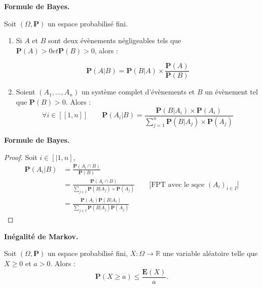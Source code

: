 \documentclass{beamer}
\begin{document}
\begin{frame}{\textbf{Formule de Bayes.}}
    \begin{theorem}
        Soit $(\Omega, \mathbf{P})$ un espace probabilisé fini.
        \begin{enumerate}[label=(\alph*)]
            \item Si $A$ et $B$ sont deux évènements négligeables tels que $\mathbf{P}(A) > 0 et \mathbf{P}(B) > 0$, alors : 
            
            \[
                \mathbf{P}(A|B) = \mathbf{P}(B|A) \times \frac{\mathbf{P}(A)}{\mathbf{P}(B)}    
            \]
            \item Soient $(A_1, \ldots, A_n)$ un système complet d'évènements et $B$ un évènement tel que $\mathbf{P}(B) > 0$. Alors :
            \[
                \forall i \in [[1, n]] \qquad \mathbf{P}(A_i | B) = \frac{\mathbf{P}(B|A_i)\times \mathbf{P}(A_i)}{\displaystyle\sum_{j=1}^{n}\mathbf{P}(B | A_j)\times \mathbf{P}(A_j)}
            \]
        \end{enumerate}
    \end{theorem}
\end{frame}

\begin{frame}{\textbf{Formule de Bayes.}}
    \begin{proof}
        Soit $i \in [|1, n]$,
        \begin{align*}
            \mathbf{P}(A_i | B) &= \frac{\mathbf{P}(A_i \cap B)}{\mathbf{P}(B)} \\
            & = \frac{\mathbf{P}(A_i \cap B)}{\displaystyle\sum_{j \in I}\mathbf{P}(B|A_j)\times \mathbf{P}(A_j)} \qquad \text{[FPT avec le sqce $(A_i)_{i \in I}$]}
            \\
            & = \frac{\mathbf{P}(A_i)\mathbf{P}(B|A_i)}{\displaystyle\sum_{j \in I} \mathbf{P}(B|A_j)\mathbf{P}(A_j)}
        \end{align*}
    \end{proof}
\end{frame}

\begin{frame}{\textbf{Inégalité de Markov.}}
    \begin{theorem}
        Soit $(\Omega, \mathbf{P})$ un espace probabilisé fini, $X : \Omega \longrightarrow \mathbb{R}$ une variable aléatoire telle que $X \geq 0$ et $a > 0$. Alors : 
        \[
            \mathbf{P}(X \geq a) \leq \frac{\mathbf{E}(X)}{a}.
        \]
    \end{theorem}
\end{frame}
\end{document}
